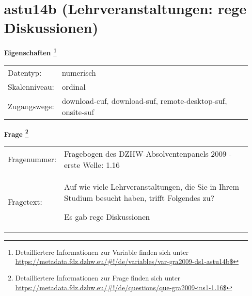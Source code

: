 
    \setcounter{footnote}{0}

    \vspace*{-1.8cm}
	\section{astu14b (Lehrveranstaltungen: rege Diskussionen)}
	\label{section:astu14b}



    \vspace*{0.5cm}
    \noindent\textbf{Eigenschaften
	\footnote{Detailliertere Informationen zur Variable finden sich unter
		\url{https://metadata.fdz.dzhw.eu/\#!/de/variables/var-gra2009-ds1-astu14b$}}}\\
	\begin{tabularx}{\hsize}{@{}lX}
	Datentyp: & numerisch \\
	Skalenniveau: & ordinal \\
	Zugangswege: &
	  download-cuf, 
	  download-suf, 
	  remote-desktop-suf, 
	  onsite-suf
 \\
    \end{tabularx}



				\vspace*{0.5cm}
                \noindent\textbf{Frage
	                \footnote{Detailliertere Informationen zur Frage finden sich unter
		              \url{https://metadata.fdz.dzhw.eu/\#!/de/questions/que-gra2009-ins1-1.16$}}}\\
				\begin{tabularx}{\hsize}{@{}lX}
					Fragenummer: &
					  Fragebogen des DZHW-Absolventenpanels 2009 - erste Welle:
					  1.16
 \\
					Fragetext: & Auf wie viele Lehrveranstaltungen, die Sie in Ihrem Studium besucht haben, trifft Folgendes zu?\par  Es gab rege Diskussionen \\
				\end{tabularx}





